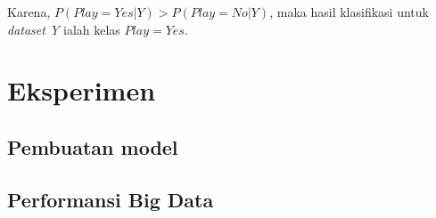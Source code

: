 	Karena, $P(Play=Yes|Y) > P(Play=No|Y)$, maka hasil klasifikasi untuk \textit{dataset Y} ialah kelas $Play=Yes$.
	


\section{Eksperimen}

\subsection{Pembuatan model}

\subsection{Performansi Big Data}
